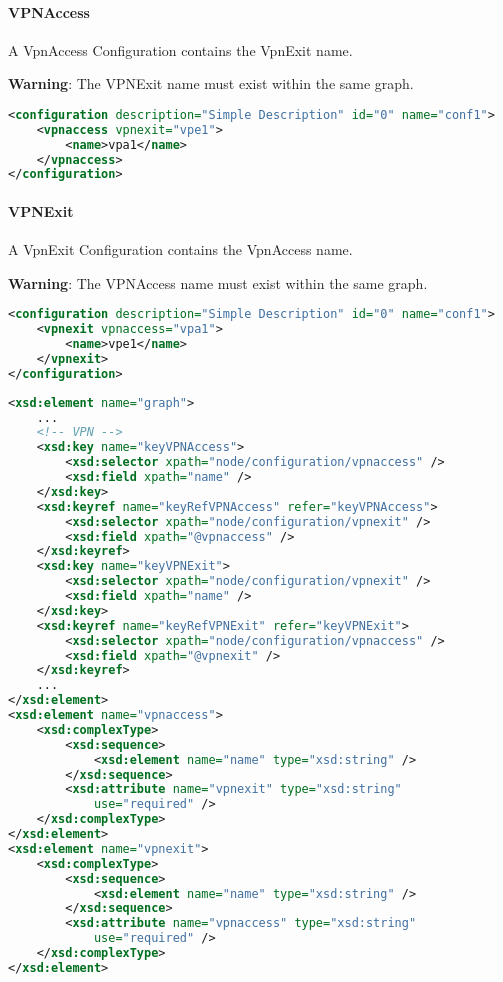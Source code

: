 \paragraph{VPNAccess}

A VpnAccess Configuration contains the VpnExit name.

\begin{warning}
\textbf{Warning}: The VPNExit name must exist within the same graph.
\end{warning}

\begin{lstlisting}[language=XML, caption=VPNAccess Configuration Example]
<configuration description="Simple Description" id="0" name="conf1">
    <vpnaccess vpnexit="vpe1">
        <name>vpa1</name>
    </vpnaccess>
</configuration>
\end{lstlisting}

\paragraph{VPNExit}

A VpnExit Configuration contains the VpnAccess name.

\begin{warning}
\textbf{Warning}: The VPNAccess name must exist within the same graph.
\end{warning}

\begin{lstlisting}[language=XML, caption=VPNExit Configuration Example]
<configuration description="Simple Description" id="0" name="conf1">
    <vpnexit vpnaccess="vpa1">
    	<name>vpe1</name>
    </vpnexit>
</configuration>
\end{lstlisting}

\begin{lstlisting}[language=XML, caption=VPNAccess and VPNExit schema code snippet]
<xsd:element name="graph">
    ...
    <!-- VPN -->
    <xsd:key name="keyVPNAccess">
        <xsd:selector xpath="node/configuration/vpnaccess" />
        <xsd:field xpath="name" />
    </xsd:key>
    <xsd:keyref name="keyRefVPNAccess" refer="keyVPNAccess">
        <xsd:selector xpath="node/configuration/vpnexit" />
        <xsd:field xpath="@vpnaccess" />
    </xsd:keyref>
    <xsd:key name="keyVPNExit">
        <xsd:selector xpath="node/configuration/vpnexit" />
        <xsd:field xpath="name" />
    </xsd:key>
    <xsd:keyref name="keyRefVPNExit" refer="keyVPNExit">
        <xsd:selector xpath="node/configuration/vpnaccess" />
        <xsd:field xpath="@vpnexit" />
    </xsd:keyref>
    ...
</xsd:element>
<xsd:element name="vpnaccess">
    <xsd:complexType>
    	<xsd:sequence>
            <xsd:element name="name" type="xsd:string" />
        </xsd:sequence>
        <xsd:attribute name="vpnexit" type="xsd:string"
            use="required" />
    </xsd:complexType>
</xsd:element>
<xsd:element name="vpnexit">
    <xsd:complexType>
    	<xsd:sequence>
            <xsd:element name="name" type="xsd:string" />
        </xsd:sequence>
        <xsd:attribute name="vpnaccess" type="xsd:string"
            use="required" />
    </xsd:complexType>
</xsd:element>
\end{lstlisting}

